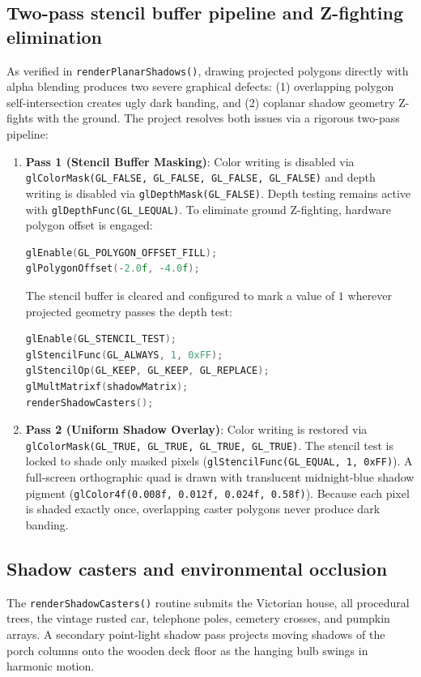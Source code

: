 \documentclass[10pt,a4paper,oneside]{article}
\begin{document}
\subsection{Two-pass stencil buffer pipeline and Z-fighting elimination}
As verified in \texttt{renderPlanarShadows()}, drawing projected polygons directly with alpha blending produces two severe graphical defects: (1) overlapping polygon self-intersection creates ugly dark banding, and (2) coplanar shadow geometry Z-fights with the ground. The project resolves both issues via a rigorous two-pass pipeline:
\begin{enumerate}[leftmargin=1.5em]
\item \textbf{Pass 1 (Stencil Buffer Masking)}:
Color writing is disabled via \texttt{glColorMask(GL\_FALSE, GL\_FALSE, GL\_FALSE, GL\_FALSE)} and depth writing is disabled via \texttt{glDepthMask(GL\_FALSE)}. Depth testing remains active with \texttt{glDepthFunc(GL\_LEQUAL)}. To eliminate ground Z-fighting, hardware polygon offset is engaged:
\begin{lstlisting}[language=C++]
glEnable(GL_POLYGON_OFFSET_FILL);
glPolygonOffset(-2.0f, -4.0f);
\end{lstlisting}
The stencil buffer is cleared and configured to mark a value of $1$ wherever projected geometry passes the depth test:
\begin{lstlisting}[language=C++]
glEnable(GL_STENCIL_TEST);
glStencilFunc(GL_ALWAYS, 1, 0xFF);
glStencilOp(GL_KEEP, GL_KEEP, GL_REPLACE);
glMultMatrixf(shadowMatrix);
renderShadowCasters();
\end{lstlisting}

\item \textbf{Pass 2 (Uniform Shadow Overlay)}:
Color writing is restored via \texttt{glColorMask(GL\_TRUE, GL\_TRUE, GL\_TRUE, GL\_TRUE)}. The stencil test is locked to shade only masked pixels (\texttt{glStencilFunc(GL\_EQUAL, 1, 0xFF)}). A full-screen orthographic quad is drawn with translucent midnight-blue shadow pigment (\texttt{glColor4f(0.008f, 0.012f, 0.024f, 0.58f)}). Because each pixel is shaded exactly once, overlapping caster polygons never produce dark banding.
\end{enumerate}

\subsection{Shadow casters and environmental occlusion}
The \texttt{renderShadowCasters()} routine submits the Victorian house, all procedural trees, the vintage rusted car, telephone poles, cemetery crosses, and pumpkin arrays. A secondary point-light shadow pass projects moving shadows of the porch columns onto the wooden deck floor as the hanging bulb swings in harmonic motion.
\end{document}
